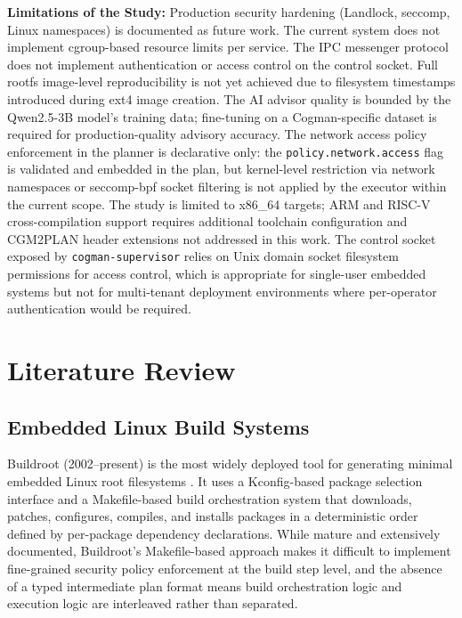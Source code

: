 \documentclass[12pt,a4paper]{report}
\begin{document}
\textbf{Limitations of the Study:}
Production security hardening (Landlock, seccomp, Linux namespaces) is documented
as future work. The current system does not implement cgroup-based resource limits
per service. The IPC messenger protocol does not implement authentication or
access control on the control socket. Full rootfs image-level reproducibility is
not yet achieved due to filesystem timestamps introduced during ext4 image
creation. The AI advisor quality is bounded by the Qwen2.5-3B model's training
data; fine-tuning on a Cogman-specific dataset is required for production-quality
advisory accuracy. The network access policy enforcement in the planner is
declarative only: the \texttt{policy.network.access} flag is validated and embedded
in the plan, but kernel-level restriction via network namespaces or seccomp-bpf
socket filtering is not applied by the executor within the current scope. The study
is limited to x86\_64 targets; ARM and RISC-V cross-compilation support requires
additional toolchain configuration and CGM2PLAN header extensions not addressed in
this work. The control socket exposed by \texttt{cogman-supervisor} relies on Unix
domain socket filesystem permissions for access control, which is appropriate for
single-user embedded systems but not for multi-tenant deployment environments where
per-operator authentication would be required.

\chapter{Literature Review}

\section{Embedded Linux Build Systems}

Buildroot (2002--present) is the most widely deployed tool for generating minimal
embedded Linux root filesystems \cite{buildroot}. It uses a Kconfig-based package
selection interface and a Makefile-based build orchestration system that downloads,
patches, configures, compiles, and installs packages in a deterministic order
defined by per-package dependency declarations. While mature and extensively
documented, Buildroot's Makefile-based approach makes it difficult to implement
fine-grained security policy enforcement at the build step level, and the absence
of a typed intermediate plan format means build orchestration logic and execution
logic are interleaved rather than separated.
\end{document}
